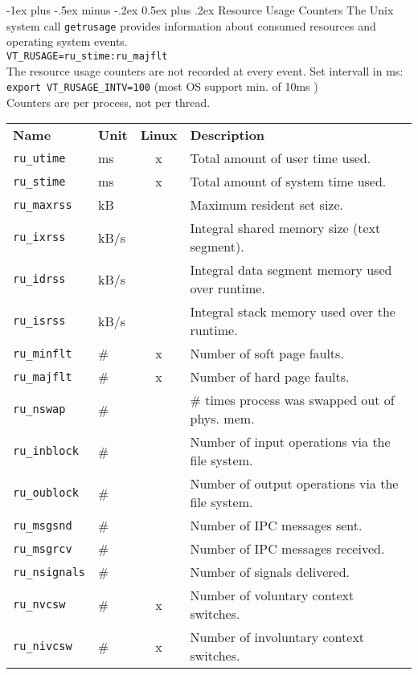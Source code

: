 \documentclass[letterpaper,10pt,landscape]{article}
\makeatletter
\renewcommand{\section}{\@startsection{section}{1}{0mm}%
                                {-1ex plus -.5ex minus -.2ex}%
                                {0.5ex plus .2ex}%
                                {\normalfont\large\bfseries}}
\makeatother
\begin{document}
\begin{multicols}{3}
\section{Resource Usage Counters}
The Unix system call \texttt{getrusage} provides information about consumed  resources and operating system events.\\
\verb|VT_RUSAGE=ru_stime:ru_majflt|\\
The resource usage counters are not recorded at every event. Set intervall in ms:\\
\texttt{export VT\_RUSAGE\_INTV=100} (most OS support min. of 10ms )\\
Counters are per process, not per thread.
\begin{tabular}{@{}l@{}l@{ }c@{ }l@{}}
\textbf{Name}          &  \textbf{Unit}  & \textbf{Linux} & \textbf{Description}  \\
\texttt{ru\_utime}     &  ms             & x         & Total amount of user time used.  \\
\texttt{ru\_stime}     &  ms             & x         & Total amount of system time used.  \\
\texttt{ru\_maxrss}    &  kB             &           & Maximum resident set size. \\
\texttt{ru\_ixrss}     &  kB/s           &           & Integral shared memory size (text segment). \\
\texttt{ru\_idrss}     &  kB/s           &           & Integral data segment memory used over runtime. \\
\texttt{ru\_isrss}     &  kB/s           &           & Integral stack memory used over the runtime. \\
\texttt{ru\_minflt}    &  \#             & x         & Number of soft page faults. \\
\texttt{ru\_majflt}    &  \#             & x         & Number of hard page faults. \\
\texttt{ru\_nswap}     &  \#             &           & \# times process was swapped out of phys. mem. \\
\texttt{ru\_inblock}   &  \#             &           & Number of input operations via the file system. \\
\texttt{ru\_oublock}   &  \#             &           & Number of output operations via the file system. \\
\texttt{ru\_msgsnd}    &  \#             &           & Number of IPC messages sent. \\
\texttt{ru\_msgrcv}    &  \#             &           & Number of IPC messages received. \\
\texttt{ru\_nsignals}  &  \#             &           & Number of signals delivered. \\
\texttt{ru\_nvcsw}     &  \#             & x         & Number of voluntary context switches. \\
\texttt{ru\_nivcsw}    &  \#             & x         & Number of involuntary context switches. \\
\end{tabular}


\end{multicols}
\end{document}
